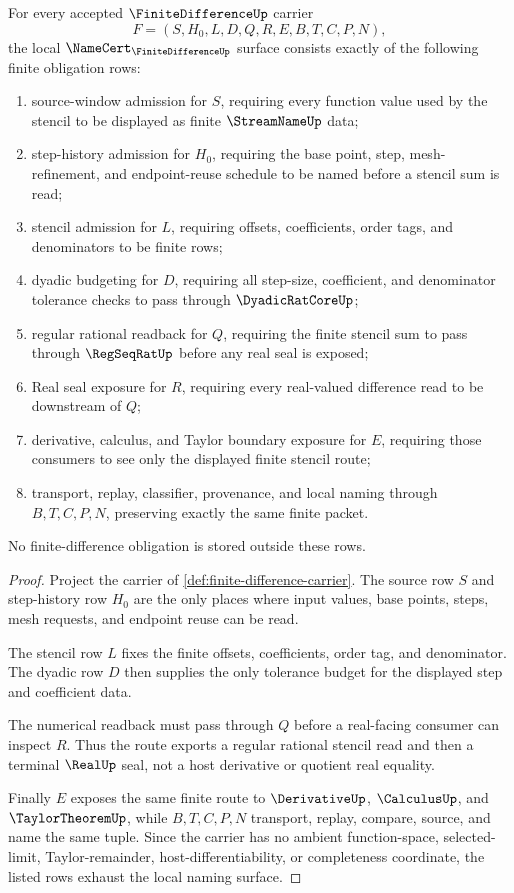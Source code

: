 \begin{theorem}
\label{thm:finite-difference-namecert-obligations}
For every accepted $\FiniteDifferenceUp$ carrier
$$
F=(S,H_0,L,D,Q,R,E,B,T,C,P,N),
$$
the local $\NameCert_{\FiniteDifferenceUp}$ surface consists exactly of the following finite obligation rows:
\begin{enumerate}
\item source-window admission for $S$, requiring every function value used by the stencil to be displayed as finite $\StreamNameUp$ data;
\item step-history admission for $H_0$, requiring the base point, step, mesh-refinement, and endpoint-reuse schedule to be named before a stencil sum is read;
\item stencil admission for $L$, requiring offsets, coefficients, order tags, and denominators to be finite rows;
\item dyadic budgeting for $D$, requiring all step-size, coefficient, and denominator tolerance checks to pass through $\DyadicRatCoreUp$;
\item regular rational readback for $Q$, requiring the finite stencil sum to pass through $\RegSeqRatUp$ before any real seal is exposed;
\item Real seal exposure for $R$, requiring every real-valued difference read to be downstream of $Q$;
\item derivative, calculus, and Taylor boundary exposure for $E$, requiring those consumers to see only the displayed finite stencil route;
\item transport, replay, classifier, provenance, and local naming through $B,T,C,P,N$, preserving exactly the same finite packet.
\end{enumerate}
No finite-difference obligation is stored outside these rows.
\end{theorem}
\begin{proof}
Project the carrier of \autoref{def:finite-difference-carrier}. The source row $S$ and step-history row $H_0$ are the only places where input values, base points, steps, mesh requests, and endpoint reuse can be read.

The stencil row $L$ fixes the finite offsets, coefficients, order tag, and denominator. The dyadic row $D$ then supplies the only tolerance budget for the displayed step and coefficient data.

The numerical readback must pass through $Q$ before a real-facing consumer can inspect $R$. Thus the route exports a regular rational stencil read and then a terminal $\RealUp$ seal, not a host derivative or quotient real equality.

Finally $E$ exposes the same finite route to $\DerivativeUp$, $\CalculusUp$, and $\TaylorTheoremUp$, while $B,T,C,P,N$ transport, replay, compare, source, and name the same tuple. Since the carrier has no ambient function-space, selected-limit, Taylor-remainder, host-differentiability, or completeness coordinate, the listed rows exhaust the local naming surface.
\end{proof}

